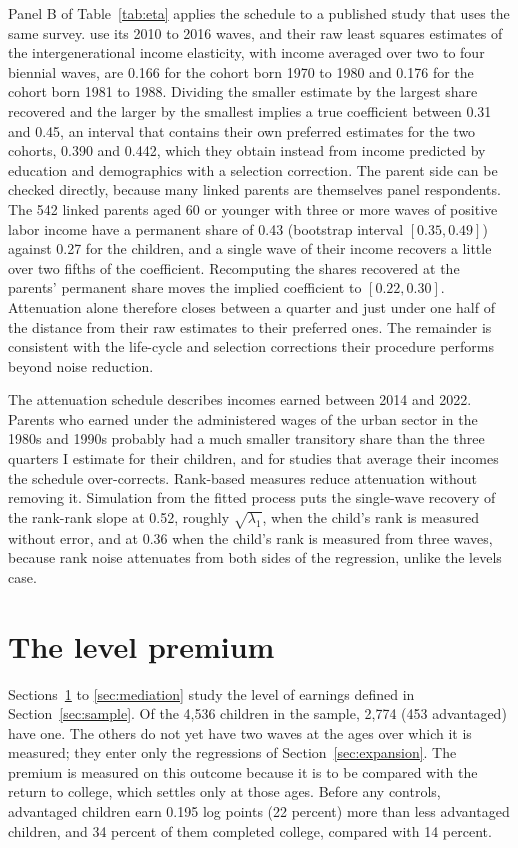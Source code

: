 \documentclass[11pt]{article}
\begin{document}
Panel B of Table~\ref{tab:eta} applies the schedule to a published
study that uses the same survey. \citet{FanYiZhang2021}
use its 2010 to 2016 waves, and their raw
least squares estimates of the intergenerational income elasticity, with income averaged over two to
four biennial waves, are 0.166 for the cohort born 1970 to 1980 and 0.176 for the cohort born 1981 to 1988. Dividing the smaller estimate by the largest share recovered and the
larger by the smallest implies a true coefficient between 0.31 and 0.45, an interval that contains their own preferred estimates for the two cohorts, 0.390 and 0.442,
which they obtain instead from income predicted by education and demographics with a
selection correction. The parent side can be checked directly, because
many linked parents are themselves panel respondents. The 542 linked parents aged 60 or younger with three or more waves of positive labor income have a permanent share of 0.43 (bootstrap interval $[0.35, 0.49]$) against 0.27 for the children, and a single wave of their income recovers a little over two fifths of the coefficient. Recomputing the shares recovered
at the parents' permanent share moves the implied coefficient to $[0.22, 0.30]$. Attenuation alone therefore closes between a quarter and just under one half of the distance from their raw estimates to their preferred
ones. The remainder is consistent with the life-cycle and selection
corrections their procedure performs beyond noise reduction.

The attenuation schedule describes incomes earned between 2014 and 2022. Parents
who earned under the administered wages of the urban sector in the
1980s and 1990s probably had a much smaller transitory share than the
three quarters I estimate for their children, and for studies that average their incomes
the schedule over-corrects. Rank-based
measures \citep{Chetty2014} reduce attenuation without removing it.
Simulation from the fitted process puts the single-wave recovery of the rank-rank slope at 0.52, roughly $\sqrt{\lambda_1}$, when the child's rank
is measured without error, and at 0.36 when the child's rank is measured from three waves, because rank noise
attenuates from both sides of the regression, unlike the levels case.

\section{The level premium}
\label{sec:premium}

Sections~\ref{sec:premium} to \ref{sec:mediation} study
the level of earnings defined in Section~\ref{sec:sample}. Of the 4,536 children in the sample, 2,774 (453
advantaged) have one. The others do not yet have two waves at the ages
over which it is measured; they enter only the regressions of
Section~\ref{sec:expansion}. The
premium is measured on this outcome because it is to be compared with the
return to college, which settles only at those ages. Before any controls, advantaged children earn 0.195 log points (22 percent) more than less advantaged children, and 34 percent of them completed college, compared with 14 percent.
\end{document}
